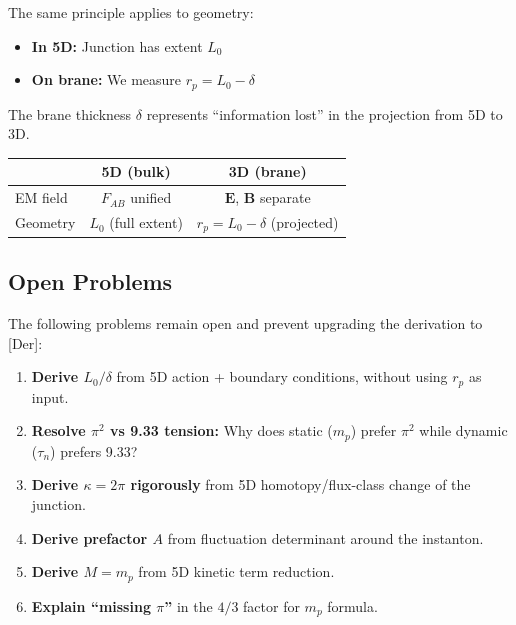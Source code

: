 \documentclass[11pt,a4paper]{article}
\begin{document}
The same principle applies to geometry:
\begin{itemize}
\item \textbf{In 5D:} Junction has extent $L_0$
\item \textbf{On brane:} We measure $r_p = L_0 - \delta$
\end{itemize}

The brane thickness $\delta$ represents ``information lost'' in the projection from 5D to 3D.

\begin{center}
\begin{tabular}{lcc}
\toprule
& \textbf{5D (bulk)} & \textbf{3D (brane)} \\
\midrule
EM field & $F_{AB}$ unified & $\mathbf{E}$, $\mathbf{B}$ separate \\
Geometry & $L_0$ (full extent) & $r_p = L_0 - \delta$ (projected) \\
\bottomrule
\end{tabular}
\end{center}

\subsection{Open Problems}

The following problems remain open and prevent upgrading the derivation to [Der]:

\begin{tcolorbox}[colback=yellow!10!white, colframe=orange!50!black, title=Open Problems]
\begin{enumerate}
\item \textbf{Derive $L_0/\delta$} from 5D action + boundary conditions, without using $r_p$ as input.

\item \textbf{Resolve $\pi^2$ vs 9.33 tension:} Why does static ($m_p$) prefer $\pi^2$ while dynamic ($\tau_n$) prefers 9.33?

\item \textbf{Derive $\kappa = 2\pi$ rigorously} from 5D homotopy/flux-class change of the junction.

\item \textbf{Derive prefactor $A$} from fluctuation determinant around the instanton.

\item \textbf{Derive $M = m_p$} from 5D kinetic term reduction.

\item \textbf{Explain ``missing $\pi$''} in the $4/3$ factor for $m_p$ formula.
\end{enumerate}
\end{tcolorbox}
\end{document}
